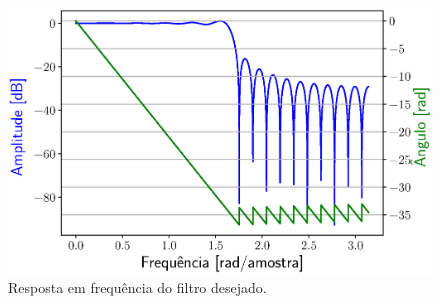 \documentclass{homeworkclass}
\begin{document}
\begin{homeworkProblem}
\begin{homeworkSection}
\begin{figure}[!ht]
	\centering
	\includegraphics[width=0.6\linewidth]{figs/freq}
	\caption{Resposta em frequência do filtro desejado.}
	\label{fig:freq}
\end{figure}

\end{homeworkSection}
\end{homeworkProblem}
\end{document}
